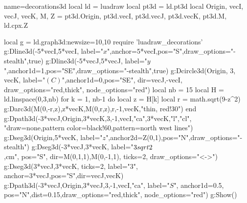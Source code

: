 \begin{luadraw}{name=decorations3d}
local ld = luadraw
local pt3d = ld.pt3d
local Origin, vecI, vecJ, vecK, M, Z = pt3d.Origin, pt3d.vecI, pt3d.vecJ, pt3d.vecK, pt3d.M, ld.cpx.Z

local g = ld.graph3d:new{size={10,10}}
require 'luadraw_decorations'
g:Dline3d(-5*vecI,5*vecI, {label="$x$",anchor=5*vecI,pos="S",draw_options="-stealth"},true)
g:Dline3d(-5*vecJ,5*vecJ, {label="$y$",anchor1d=1,pos="SE",draw_options="-stealth"},true)
g:Dcircle3d(Origin, 3, vecK, {label="$(C)$",anchor1d=0,pos="SE",
    dir={vecJ,-vecI}, draw_options="red,thick", node_options="red"})
local nb = 15
local H = ld.linspace(0,3,nb)
for k = 1, nb-1 do
    local z = H[k]
    local r = math.sqrt(9-z^2)
    g:Darc3d(M(0,-r,z),z*vecK,M(0,r,z),r,-1,vecK,"thin, red!30")
end
g:Dpath3d({-3*vecJ,Origin,3*vecK,3,-1,vecI,"ca",3*vecK,"l","cl"},
    "draw=none,pattern color=black!60,pattern=north west lines")
g:Dseg3d({Origin,5*vecK}, 
    {label="$z$",anchor2d=Z(0,1),pos="N",draw_options="-stealth"})   
g:Dseg3d({-3*vecJ,3*vecK}, {label="$3\\sqrt 2$\\,cm", pos="S", dir={M(0,1,1),M(0,-1,1)},
    ticks=2, draw_options="<->"}) 
g:Dseg3d({3*vecJ,3*vecK}, 
    {ticks=2, label="$3$", anchor=3*vecJ,pos="S",dir={vecJ,vecK}}) 
g:Dpath3d({-3*vecJ,Origin,3*vecJ,3,-1,vecI,"ca"}, 
    {label="$S$", anchor1d=0.5, pos="N",dist=0.15,draw_options="red,thick", node_options="red"})
g:Show()
\end{luadraw}
